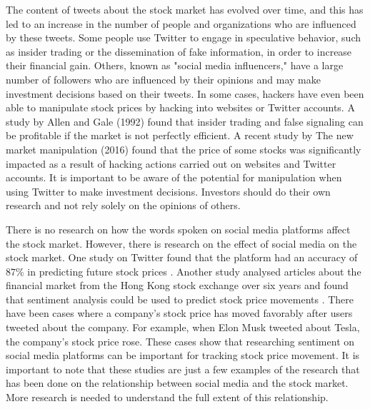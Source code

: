\documentclass[12pt, a4paper,twoside]{report}
\theoremstyle{plain} %
\theoremstyle{definition} %
\theoremstyle{remark} %
\numberwithin{equation}{chapter}
\begin{document}
The content of tweets about the stock market has evolved over time, and this has led to an increase in the number of people and organizations who are influenced by these tweets. Some people use Twitter to engage in speculative behavior, such as insider trading or the dissemination of fake information, in order to increase their financial gain. Others, known as "social media influencers," have a large number of followers who are influenced by their opinions and may make investment decisions based on their tweets. In some cases, hackers have even been able to manipulate stock prices by hacking into websites or Twitter accounts. A study by Allen and Gale (1992) \cite{allen1992stock}found that insider trading and false signaling can be profitable if the market is not perfectly efficient. A recent study by The new market manipulation (2016) \cite{Lin2016} found that the price of some stocks was significantly impacted as a result of hacking actions carried out on websites and Twitter accounts. It is important to be aware of the potential for manipulation when using Twitter to make investment decisions. Investors should do their own research and not rely solely on the opinions of others.

There is no research on how the words spoken on social media platforms affect the stock market. However, there is research on the effect of social media on the stock market. One study on Twitter found that the platform had an accuracy of 87\% in predicting future stock prices \cite{phillips2017using}. Another study analysed articles about the financial market from the Hong Kong stock exchange over six years and found that sentiment analysis could be used to predict stock price movements \cite{li2014news}. There have been cases where a company's stock price has moved favorably after users tweeted about the company. For example, when Elon Musk tweeted about Tesla, the company's stock price rose. These cases show that researching sentiment on social media platforms can be important for tracking stock price movement. It is important to note that these studies are just a few examples of the research that has been done on the relationship between social media and the stock market. More research is needed to understand the full extent of this relationship.
\end{document}
